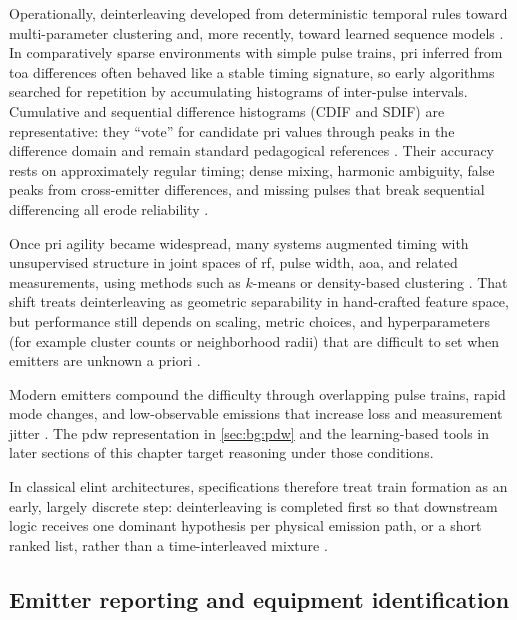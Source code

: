 Operationally, deinterleaving developed from deterministic temporal rules toward multi-parameter clustering and, more recently, toward learned sequence models \parencite{qu2026radardeinterleavingreview}.
In comparatively sparse environments with simple pulse trains, \gls{pri} inferred from \gls{toa} differences often behaved like a stable timing signature, so early algorithms searched for repetition by accumulating histograms of inter-pulse intervals.
Cumulative and sequential difference histograms (CDIF and SDIF) are representative: they ``vote'' for candidate \gls{pri} values through peaks in the difference domain and remain standard pedagogical references \parencite{qu2026radardeinterleavingreview,wiley2006elint}.
Their accuracy rests on approximately regular timing; dense mixing, harmonic ambiguity, false peaks from cross-emitter differences, and missing pulses that break sequential differencing all erode reliability \parencite{qu2026radardeinterleavingreview}.

Once \gls{pri} agility became widespread, many systems augmented timing with unsupervised structure in joint spaces of \gls{rf}, pulse width, \gls{aoa}, and related measurements, using methods such as $k$-means or density-based clustering \parencite{qu2026radardeinterleavingreview,ester1996density}.
That shift treats deinterleaving as geometric separability in hand-crafted feature space, but performance still depends on scaling, metric choices, and hyperparameters (for example cluster counts or neighborhood radii) that are difficult to set when emitters are unknown a priori \parencite{qu2026radardeinterleavingreview}.

Modern emitters compound the difficulty through overlapping pulse trains, rapid mode changes, and low-observable emissions that increase loss and measurement jitter \parencite{qu2026radardeinterleavingreview}.
The \gls{pdw} representation in \cref{sec:bg:pdw} and the learning-based tools in later sections of this chapter target reasoning under those conditions.

In classical \gls{elint} architectures, specifications therefore treat train formation as an early, largely discrete step: deinterleaving is completed first so that downstream logic receives one dominant hypothesis per physical emission path, or a short ranked list, rather than a time-interleaved mixture \parencite{wiley2006elint}.

\subsection{Emitter reporting and equipment identification}

